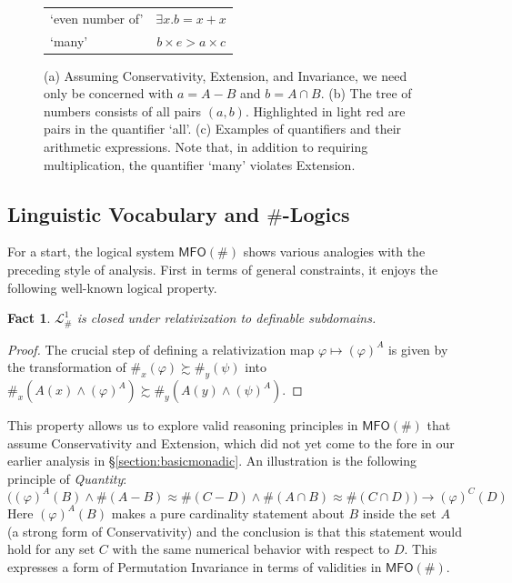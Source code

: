 \documentclass[12pt,oneside,reqno]{amsart}
\newtheorem{fact}{Fact}
\theoremstyle{definition}
\begin{document}
\begin{figure}
{\begin{tabular}{|l | c|}
\footnotesize{}`even number of' & \footnotesize{}$\exists x. b=x+x$ \\
\footnotesize{}`many' & \footnotesize{}$b \times e > a \times c$ \\ \hline
\end{tabular} 
}
\caption{(a) Assuming Conservativity, Extension, and Invariance, we need only be concerned with $a=A-B$ and $b=A\cap B$. (b) The tree of numbers consists of all pairs $(a,b)$. Highlighted in light red are pairs in the quantifier `all'. (c) Examples of quantifiers and their arithmetic expressions. Note that, in addition to requiring multiplication, the quantifier `many' violates Extension.} \label{fig:quant}
\end{figure}

\vspace{-1ex}

\subsection{Linguistic  Vocabulary and $\#$-Logics} \label{section:vocab} For a start, the logical system $\mathsf{MFO}(\#)$ shows various analogies with the preceding style of analysis. First in terms of general constraints, it enjoys the following well-known logical property.

\begin{fact} \label{fact:relativization} $\mathcal{L}_\#^1$ is closed under  \emph{relativization} to definable subdomains. 
\end{fact}
\begin{proof} The crucial step of defining a relativization map $\varphi \mapsto (\varphi)^A$ is given by the transformation of $\#_x(\varphi) \succsim \#_y(\psi)$ into $\#_x(A(x) \wedge (\varphi)^A) \succsim \#_y(A(y) \wedge (\psi)^A)$. \end{proof}
This property allows us to explore valid reasoning principles in $\mathsf{MFO}(\#)$ that assume Conservativity and Extension, which did not yet come to the fore in our earlier analysis in \S\ref{section:basicmonadic}. An illustration is the following principle of \emph{Quantity}:
$$\big((\varphi)^A(B) \wedge \#(A-B) \approx \#(C-D) \wedge \#(A \cap B) \approx \#(C \cap D)\big) \rightarrow (\varphi)^C(D)$$
Here $(\varphi)^{A}(B)$ makes a pure cardinality statement about $B$ inside the set $A$ (a strong form of Conservativity) and the conclusion is that this statement would hold for any set $C$ with the same numerical behavior with respect to $D$. This expresses a form of Permutation Invariance in terms of validities in $\mathsf{MFO}(\#)$.
\end{document}
